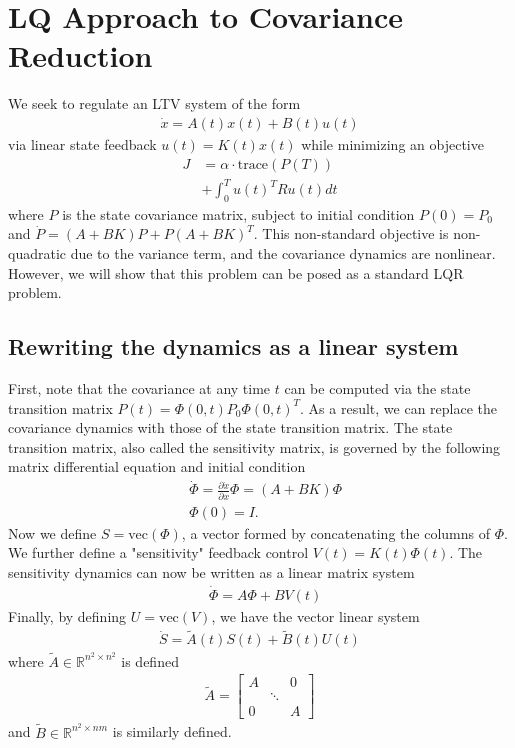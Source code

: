 \documentclass[10pt,a4paper]{article}
\begin{document}
	
	
	\section{LQ Approach to Covariance Reduction}
	We seek to regulate an LTV system of the form 
	\begin{align}
	\dot{x} = A(t)x(t) + B(t)u(t) 
	\end{align}
	via linear state feedback $u(t) = K(t)x(t)$ while minimizing an objective 
		\begin{align}
	J &= \alpha \cdot \mathrm{trace}(P(T)) \nonumber\\
	&+ \int_{0}^{T} u(t)^TRu(t) dt
	\end{align}	
	where $P$ is the state covariance matrix, subject to initial condition $P(0) = P_0$ and $\dot{P} = (A+BK)P + P(A+BK)^T$.
	This non-standard objective is non-quadratic due to the variance term, and the covariance dynamics are nonlinear. However, we will show that this problem can be posed as a standard LQR problem.
		
	\subsection{Rewriting the dynamics as a linear system}
	First, note that the covariance at any time $t$ can be computed via the state transition matrix $P(t) = \Phi(0, t)P_0\Phi(0, t)^T$. As a result, we can replace the covariance dynamics with those of the state transition matrix. The state transition matrix, also called the sensitivity matrix, is governed by the following matrix differential equation and initial condition
	\begin{align}
	&\dot{\Phi} = \frac{\partial \dot{x}}{\partial x}\Phi = (A+BK)\Phi \\
	&\Phi(0) = I. 
	\end{align}
	Now we define $S = \mathrm{vec}(\Phi)$, a vector formed by concatenating the columns of $\Phi$. We further define a "sensitivity" feedback control $V(t) = K(t)\Phi(t)$. The sensitivity dynamics can now be written as a linear matrix system
		\begin{align}
	&\dot{\Phi} = A\Phi + BV(t)
	\end{align}
 Finally, by defining $U = \mathrm{vec}(V)$, we have the vector linear system 
		\begin{align}
	\dot{S} = \tilde{A}(t)S(t) + \tilde{B}(t)U(t) 
	\end{align}
	where $\tilde{A}\in \mathbb{R}^{n^2 \times n^2}$ is defined 
	\begin{align}
	\tilde{A} = 
	\begin{bmatrix}
	A & & 0 \\
	& \ddots \\
	0 &  & A
	\end{bmatrix}
	\end{align} and $\tilde{B} \in \mathbb{R}^{n^2 \times nm}$ is similarly defined.
	
\end{document}
